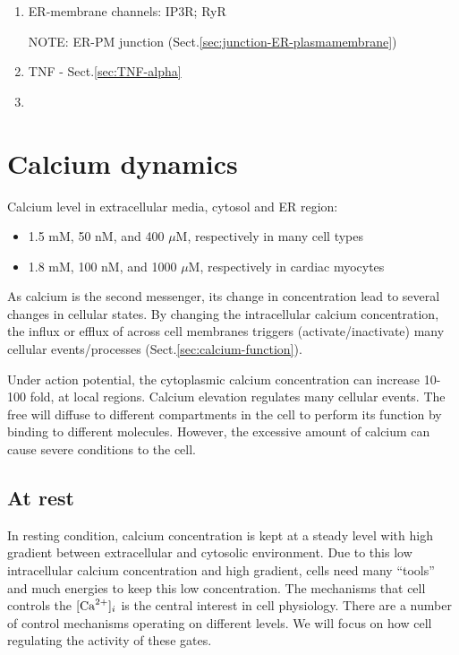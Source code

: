 \begin{enumerate}
  \item ER-membrane channels: IP3R; RyR

NOTE: ER-PM junction (Sect.\ref{sec:junction-ER-plasmamembrane})
  
  \item TNF - Sect.\ref{sec:TNF-alpha}
  
  \item  
\end{enumerate}

\section{Calcium dynamics}
\label{sec:calcium-dynamics}
\label{sec:calcium-homeostasis}


Calcium level in extracellular media, cytosol and ER region:
\begin{itemize}
  \item  1.5 mM, 50 nM, and 400 $\mu$M, respectively in many cell types
  
  \item  1.8 mM, 100 nM, and 1000 $\mu$M, respectively in cardiac myocytes
  
\end{itemize}


As calcium is the second messenger, its change in concentration lead to several
changes in cellular states. By changing the intracellular calcium concentration,
the influx or efflux of  across cell membranes triggers
(activate/inactivate) many cellular events/processes
(Sect.\ref{sec:calcium-function}).

Under action potential, the cytoplasmic calcium concentration can
increase 10-100 fold, at local regions. Calcium elevation
regulates many cellular events.  The free  will diffuse to different
compartments in the cell to perform its function by binding to different
molecules. However, the excessive amount of calcium
can cause severe conditions to the cell. 

\subsection{At rest}

In resting condition, calcium concentration is kept at a steady level
with high gradient between extracellular and cytosolic environment.
Due to this low intracellular calcium concentration and high gradient, cells
need many ``tools'' and much energies to keep this low concentration.
The mechanisms that cell controls the $[\ce{Ca^2+}]_i$ is the central interest
in cell physiology.  There are a number of  control mechanisms
operating on different levels. We will focus on how cell regulating the activity
of these gates.


